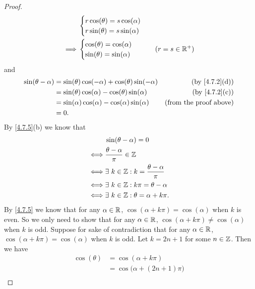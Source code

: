 \begin{proof}
\begin{align*}
             & \begin{cases}
                 r \cos(\theta) = s \cos(\alpha) \\
                 r \sin(\theta) = s \sin(\alpha)
               \end{cases}    \\
    \implies & \begin{cases}
                 \cos(\theta) = \cos(\alpha) \\
                 \sin(\theta) = \sin(\alpha)
               \end{cases}     & (r = s \in \mathbb{R}^+)
  \end{align*}
  and
  \begin{align*}
    \sin(\theta - \alpha) & = \sin(\theta) \cos(-\alpha) + \cos(\theta) \sin(-\alpha) & \text{(by \cref{4.7.2}(d))}   \\
                          & = \sin(\theta) \cos(\alpha) - \cos(\theta) \sin(\alpha)   & \text{(by \cref{4.7.2}(c))}   \\
                          & = \sin(\alpha) \cos(\alpha) - \cos(\alpha) \sin(\alpha)   & \text{(from the proof above)} \\
                          & = 0.
  \end{align*}
  By \cref{4.7.5}(b) we know that
  \begin{align*}
         & \sin(\theta - \alpha) = 0                           \\
    \iff & \frac{\theta - \alpha}{\pi} \in \mathbb{Z}                  \\
    \iff & \exists\ k \in \mathbb{Z} : k = \frac{\theta - \alpha}{\pi} \\
    \iff & \exists\ k \in \mathbb{Z} : k \pi = \theta - \alpha         \\
    \iff & \exists\ k \in \mathbb{Z} : \theta = \alpha + k \pi.
  \end{align*}
  By \cref{4.7.5} we know that for any \(\alpha \in \mathbb{R}\), \(\cos(\alpha + k \pi) = \cos(\alpha)\) when \(k\) is even.
  So we only need to show that for any \(\alpha \in \mathbb{R}\), \(\cos(\alpha + k \pi) \neq \cos(\alpha)\) when \(k\) is odd.
  Suppose for sake of contradiction that for any \(\alpha \in \mathbb{R}\), \(\cos(\alpha + k \pi) = \cos(\alpha)\) when \(k\) is odd.
  Let \(k = 2n + 1\) for some \(n \in \mathbb{Z}\).
  Then we have
  \begin{align*}
    \cos(\theta) & = \cos(\alpha + k \pi)                                                \\
                 & = \cos\big(\alpha + (2n + 1) \pi\big)                                 \\

\end{align*}
\end{proof}

